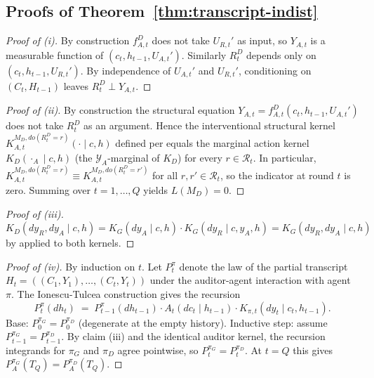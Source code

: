 \documentclass{article}
\theoremstyle{plain}
\theoremstyle{definition}
\theoremstyle{remark}
\newcommand{\YA}{\mathcal{Y}_A}
\begin{document}
\subsection{Proofs of Theorem~\ref{thm:transcript-indist}}\label{sec:thm-1-proofs}

\begin{proof}[Proof of (i)]
By construction $f_{A,t}^D$ does not take $U_{R,t}'$ as input, so $Y_{A,t}$ is
a measurable function of $(c_t, h_{t-1}, U_{A,t}')$. Similarly $R_t^D$
depends only on $(c_t, h_{t-1}, U_{R,t}')$. By independence of $U_{A,t}'$ and
$U_{R,t}'$, conditioning on $(C_t, H_{t-1})$ leaves $R_t^D \perp Y_{A,t}$.
\end{proof}

\begin{proof}[Proof of (ii)]
By construction the structural equation $Y_{A,t} = f_{A,t}^D(c_t, h_{t-1}, U_{A,t}')$
does not take $R_t^D$ as an argument. Hence the interventional structural
kernel $K^{M_D, do(R_t^D = r)}_{A, t}(\cdot \mid c, h)$ defined per
 equals the marginal action kernel $K_D(\cdot_A \mid c, h)$
(the $\YA$-marginal of $K_D$) for every $r \in \mathcal R_t$. In particular,
$K^{M_D, do(R_t^D = r)}_{A, t} \equiv K^{M_D, do(R_t^D = r')}_{A, t}$ for all
$r, r' \in \mathcal R_t$, so the indicator at round $t$ is zero. Summing over
$t = 1, \ldots, Q$ yields $L(M_D) = 0$.
\end{proof}

\begin{proof}[Proof of (iii)]
$K_D(dy_R, dy_A \mid c, h) = K_G(dy_A \mid c, h) \cdot K_G(dy_R \mid c, y_A, h)
= K_G(dy_R, dy_A \mid c, h)$ by  applied to both kernels.
\end{proof}

\begin{proof}[Proof of (iv)]
By induction on $t$. Let $P_t^\pi$ denote the law of the partial transcript
$H_t = ((C_1, Y_1), \ldots, (C_t, Y_t))$ under the auditor-agent interaction
with agent $\pi$. The Ionescu-Tulcea construction gives the recursion
\[
P_t^\pi(d h_t) \;=\; P_{t-1}^\pi(d h_{t-1}) \cdot A_t(d c_t \mid h_{t-1}) \cdot K_{\pi, t}(d y_t \mid c_t, h_{t-1}).
\]
Base: $P_0^{\pi_G} = P_0^{\pi_D}$ (degenerate at the empty history).
Inductive step: assume $P_{t-1}^{\pi_G} = P_{t-1}^{\pi_D}$. By claim (iii)
and the identical auditor kernel, the recursion integrands for $\pi_G$ and
$\pi_D$ agree pointwise, so $P_t^{\pi_G} = P_t^{\pi_D}$. At $t = Q$ this
gives $P_A^{\pi_G}(T_Q) = P_A^{\pi_D}(T_Q)$.
\end{proof}
\end{document}
